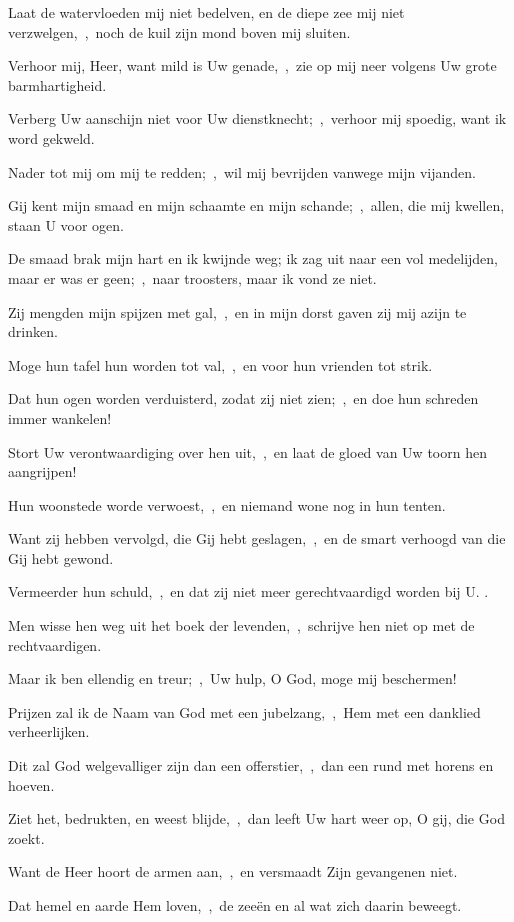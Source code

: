 \documentclass[12pt,twoside,a5paper]{article}
\begin{document}
\begin{halfparskip}
  Laat de watervloeden mij niet bedelven, en de diepe zee mij niet verzwelgen,~\sep\ noch de kuil zijn mond boven mij sluiten.

  Verhoor mij, Heer, want mild is Uw genade,~\sep\ zie op mij neer volgens Uw grote barmhartigheid.

  Verberg Uw aanschijn niet voor Uw dienstknecht;~\sep\ verhoor mij spoedig, want ik word gekweld.

  Nader tot mij om mij te redden;~\sep\ wil mij bevrijden vanwege mijn vijanden.

  Gij kent mijn smaad en mijn schaamte en mijn schande;~\sep\ allen, die mij kwellen, staan U voor ogen.

  De smaad brak mijn hart en ik kwijnde weg; ik zag uit naar een vol medelijden, maar er was er geen;~\sep\ naar troosters, maar ik vond ze niet.

  Zij mengden mijn spijzen met gal,~\sep\ en in mijn dorst gaven zij mij azijn te drinken.

  Moge hun tafel hun worden tot val,~\sep\ en voor hun vrienden tot strik.

  Dat hun ogen worden verduisterd, zodat zij niet zien;~\sep\ en doe hun schreden immer wankelen!

  Stort Uw verontwaardiging over hen uit,~\sep\ en laat de gloed van Uw toorn hen aangrijpen!

  Hun woonstede worde verwoest,~\sep\ en niemand wone nog in hun tenten.

  Want zij hebben vervolgd, die Gij hebt geslagen,~\sep\ en de smart verhoogd van die Gij hebt gewond.

  Vermeerder hun schuld,~\sep\ en dat zij niet meer gerechtvaardigd worden bij U. .

  Men wisse hen weg uit het boek der levenden,~\sep\ schrijve hen niet op met de rechtvaardigen.

  Maar ik ben ellendig en treur;~\sep\ Uw hulp, O God, moge mij beschermen!

  Prijzen zal ik de Naam van God met een jubelzang,~\sep\ Hem met een danklied verheerlijken.

  Dit zal God welgevalliger zijn dan een offerstier,~\sep\ dan een rund met horens en hoeven.

  Ziet het, bedrukten, en weest blijde,~\sep\ dan leeft Uw hart weer op, O gij, die God zoekt.

  Want de Heer hoort de armen aan,~\sep\ en versmaadt Zijn gevangenen niet.

  Dat hemel en aarde Hem loven,~\sep\ de zeeën en al wat zich daarin beweegt.


\end{halfparskip}
\end{document}
